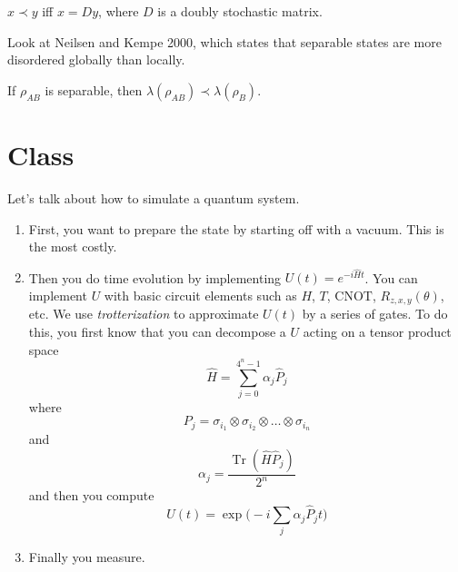 \documentclass{article}
\DeclareMathOperator{\Tr}{Tr}
\begin{document}
  \begin{theorem}
    $x \prec y$ iff $x = D y$, where $D$ is a doubly stochastic matrix. 
  \end{theorem}

  Look at Neilsen and Kempe 2000, which states that separable states are more disordered globally than locally. 

  \begin{theorem}
    If $\rho_{AB}$ is separable, then $\lambda (\rho_{AB}) \prec \lambda (\rho_B)$. 
  \end{theorem}

\section{Class} 

  Let's talk about how to simulate a quantum system. 
  \begin{enumerate}
    \item First, you want to prepare the state by starting off with a vacuum. This is the most costly. 
    \item Then you do time evolution by implementing $U (t) = e^{-i \hat{H} t}$. You can implement $U$ with basic circuit elements such as $H$, $T$, $\mathrm{CNOT}$, $R_{z, x, y} (\theta)$, etc. We use \textit{trotterization} to approximate $U(t)$ by a series of gates. To do this, you first know that you can decompose a $U$ acting on a tensor product space 
      \begin{equation}
        \hat{H} = \sum_{j=0}^{4^n - 1} \alpha_j \hat{P}_j 
      \end{equation}
      where 
      \begin{equation}
        P_j = \sigma_{i_1} \otimes \sigma_{i_2} \otimes \ldots \otimes \sigma_{i_n}
      \end{equation}
      and 
      \begin{equation}
        \alpha_j = \frac{\Tr(\hat{H} \hat{P}_j)}{2^n}
      \end{equation}
      and then you compute 
      \begin{equation}
        U(t) = \exp \bigg( -i \sum_j \alpha_j \hat{P}_j t \bigg)
      \end{equation}
    \item Finally you measure. 
  \end{enumerate}
\end{document}
